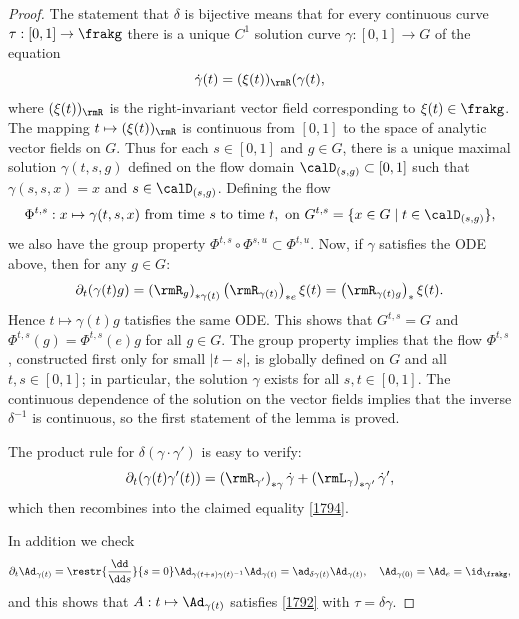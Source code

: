 \begin{proof}
    The statement that $\delta$ is bijective means that for every continuous curve $\tau:[0,1]\to\frakg$ there is a unique $C^1$ solution curve $\gamma:[0,1]\to G$ of the equation
    \[\dot\gamma(t)=(\xi(t))_\rmR(\gamma(t),\]
    where $(\xi(t))_\rmR$ is the right-invariant vector field corresponding to $\xi(t)\in\frakg$. The mapping $t\mapsto (\xi(t))_\rmR$ is continuous from $[0,1]$ to the space of analytic vector fields on $G$. Thus for each $s\in[0,1]$ and $g\in G$, there is a unique maximal solution $\gamma(t,s,g)$ defined on the flow domain $\calD_{(s,g)}\subset [0,1]$ such that $\gamma(s,s,x)=x$ and $s\in \calD_{(s,g)}$. Defining the flow
    \[\Phi^{t,s}:x\mapsto \gamma(t,s,x)\text{ from time }s\text{ to time }t,\text{ on }G^{t,s}=\{x\in G\mid t\in \calD_{(s,g)}\},\]
    we also have the group property $\Phi^{t,s}\circ \Phi^{s,u}\subset \Phi^{t,u}$. Now, if $\gamma$ satisfies the ODE above, then for any $g\in G$:
    \[\partial_t(\gamma(t)g)=\left(\rmR_{g}\right)_{\ast \gamma(t)} \left(\rmR_{\gamma(t)}\right)_{\ast e}\xi(t)=\left(\rmR_{\gamma(t)g}\right)_{\ast}\xi(t).\]
    Hence $t\mapsto \gamma(t)g$ tatisfies the same ODE. This shows that $G^{t,s}=G$ and $\Phi^{t,s}(g)=\Phi^{t,s}(e)g$ for all $g\in G$. The group property implies that the flow $\Phi^{t,s}$, constructed first only for small $|t-s|$, is globally defined on $G$ and all $t,s\in[0,1]$; in particular, the solution $\gamma$ exists for all $s,t\in [0,1]$. The continuous dependence of the solution on the vector fields implies that the inverse $\delta^{-1}$ is continuous, so the first statement of the lemma is proved.

    The product rule for $\delta(\gamma\cdot\gamma')$ is easy to verify:
    \[\partial_t(\gamma(t)\gamma'(t))=\left(\rmR_{\gamma'}\right)_{\ast \gamma}\dot\gamma+ \left(\rmL_{\gamma}\right)_{\ast \gamma'}\dot\gamma',\]
    which then recombines into the claimed equality \eqref{1794}.

    In addition we check 
    \[\partial_t \Ad_{\gamma(t)}=\restr{\frac{\dd}{\dd s}}{s=0}\Ad_{\gamma(t+s)\gamma(t)^{-1}}\Ad_{\gamma(t)}=\ad_{\delta \gamma(t)}\Ad_{\gamma(t)},\quad \Ad_{\gamma(0)}=\Ad_e=\id_\frakg,\]
    and this shows that $A:t\mapsto \Ad_{\gamma(t)}$ satisfies \eqref{1792} with $\tau=\delta\gamma$.


\end{proof}
